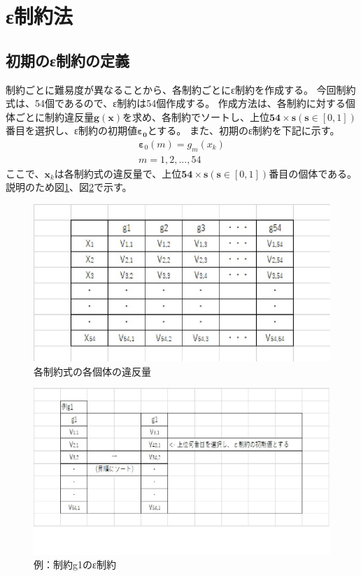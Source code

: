 \documentclass[twocolumn,10pt]{jarticle}
\begin{document}
\section{ε制約法}
\subsection{初期のε制約の定義}
制約ごとに難易度が異なることから、各制約ごとにε制約を作成する。
今回制約式は、54個であるので、ε制約は54個作成する。
作成方法は、各制約に対する個体ごとに制約違反量$\bm{g(x)}$を求め、各制約でソートし、上位$\bm{54}×\bm{s}(\bm{s}\in[0,1])$番目を選択し、ε制約の初期値$\bm{ε_0}$とする。
また、初期のε制約を下記に示す。
\begin{eqnarray}
\bm{ε}_{0}(m)={g}_{m}({x}_k)\\
m={1,2,...,54}\nonumber
\end{eqnarray}
ここで、$\bm{x}_k$は各制約式の違反量で、上位$\bm{54}×\bm{s}(\bm{s}\in[0,1])$番目の個体である。説明のため図\ref{fig:epsilon}、図\ref{fig:epsilon1}で示す。
\begin{figure}[htbp]
  \centering
  \includegraphics[width=.9\linewidth]{fig/ipusilon0.eps}
  \caption{各制約式の各個体の違反量}
\label{fig:epsilon}
\end{figure}
\begin{figure}[htbp]
  \centering
  \includegraphics[width=.9\linewidth]{fig/ipusilon1.eps}
  \caption{例：制約g1のε制約}
\label{fig:epsilon1}
\end{figure}
\end{document}

